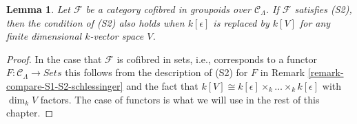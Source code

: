 \documentclass{stacks-project}
\theoremstyle{plain}
\newtheorem{lemma}[subsection]{Lemma}
\theoremstyle{definition}
\theoremstyle{remark}
\numberwithin{equation}{subsection}
\begin{document}
\begin{lemma}
\label{lemma-S2-extensions}
Let $\mathcal{F}$ be a category cofibred in groupoids over
$\mathcal{C}_\Lambda$. If $\mathcal{F}$ satisfies (S2), then the
condition of (S2) also holds when $k[\epsilon]$ is replaced by $k[V]$
for any finite dimensional $k$-vector space $V$.
\end{lemma}

\begin{proof}
In the case that $\mathcal{F}$ is cofibred in sets, i.e., corresponds
to a functor $F : \mathcal{C}_\Lambda \to \textit{Sets}$ this follows
from the description of (S2) for $F$ in
Remark \ref{remark-compare-S1-S2-schlessinger}
and the fact that
$k[V] \cong k[\epsilon] \times_k \ldots \times_k k[\epsilon]$
with $\dim_k V$ factors. The case of functors is what we will use in
the rest of this chapter.


\end{proof}
\end{document}
